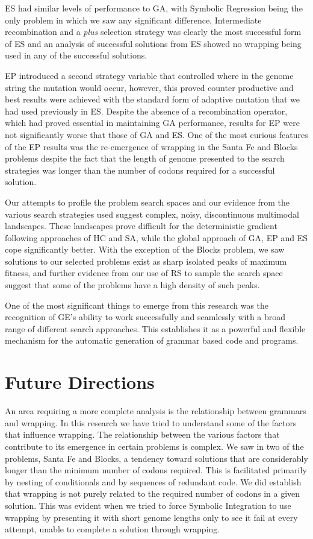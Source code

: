 ES had similar levels of performance to GA, with Symbolic Regression being the only problem in which we saw any significant difference. Intermediate recombination and a \emph{plus} selection strategy was clearly the most successful form of ES and an analysis of successful solutions from ES showed no wrapping being used in any of the successful solutions.

EP introduced a second strategy variable that controlled where in the genome string the mutation would occur, however, this proved counter productive and best results were achieved with the standard form of adaptive mutation that we had used previously in ES. Despite the absence of a recombination operator, which had proved essential in maintaining GA performance, results for EP were not significantly worse that those of GA and ES. One of the most curious features of the EP results was the re-emergence of wrapping in the Santa Fe and Blocks problems despite the fact that the length of genome presented to the search strategies was longer than the number of codons required for a successful solution. 


Our attempts to profile the problem search spaces and our evidence from the various search strategies used suggest complex, noisy, discontinuous multimodal landscapes. These landscapes prove difficult for the deterministic gradient following approaches of HC and SA, while the global approach of GA, EP and ES cope significantly better. With the exception of the Blocks problem, we saw solutions to our selected problems exist as sharp isolated peaks of maximum fitness, and further evidence from our use of RS to sample the search space suggest that some of the problems have a high density of such peaks. 



One of the most significant things to emerge from this research was the recognition of GE's ability to work successfully and seamlessly with a broad range of different search approaches. This establishes it as a powerful and flexible mechanism for the automatic generation of grammar based code and programs. 

\section{Future Directions}
An area requiring a more complete analysis is the relationship between grammars and wrapping. In this research we have tried to understand some of the factors that influence wrapping. The relationship between the various factors that contribute to its emergence in certain problems is complex. We saw in two of the problems, Santa Fe and Blocks, a tendency toward solutions that are considerably longer than the minimum number of codons required. This is facilitated primarily by nesting of conditionals and by sequences of redundant code. We did establish that wrapping is not purely related to the required number of codons in a given solution. This was evident when we tried to force Symbolic Integration to use wrapping by presenting it with short genome lengths only to see it fail at every attempt, unable to complete a solution through wrapping.

